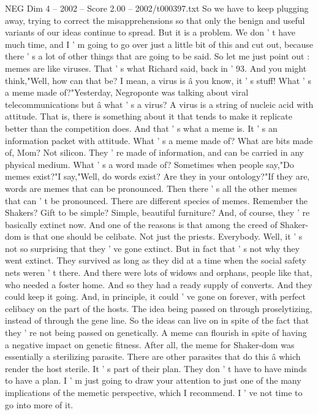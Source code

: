 \begin{textsample}{NEG Dim 4 – 2002 – Score 2.00 – 2002/t000397.txt}
So we have to keep plugging away, trying to correct the misapprehensions so that only the benign and useful variants of our ideas continue to spread.
But it is a problem.
We don ' t have much time, and I ' m going to go over just a little bit of this and cut out, because there ' s a lot of other things that are going to be said.
So let me just point out : memes are like viruses.
That ' s what Richard said, back in ' 93.
And you might think,"Well, how can that be?
I mean, a virus is â you know, it ' s stuff!
What ' s a meme made of?"Yesterday, Negroponte was talking about viral telecommunications but â what ' s a virus?
A virus is a string of nucleic acid with attitude.
That is, there is something about it that tends to make it replicate better than the competition does.
And that ' s what a meme is.
It ' s an information packet with attitude.
What ' s a meme made of?
What are bits made of, Mom?
Not silicon.
They ' re made of information, and can be carried in any physical medium.
What ' s a word made of?
Sometimes when people say,"Do memes exist?"I say,"Well, do words exist?
Are they in your ontology?"If they are, words are memes that can be pronounced.
Then there ' s all the other memes that can ' t be pronounced.
There are different species of memes.
Remember the Shakers?
Gift to be simple?
Simple, beautiful furniture?
And, of course, they ' re basically extinct now.
And one of the reasons is that among the creed of Shaker-dom is that one should be celibate.
Not just the priests.
Everybody.
Well, it ' s not so surprising that they ' ve gone extinct.
But in fact that ' s not why they went extinct.
They survived as long as they did at a time when the social safety nets weren ' t there.
And there were lots of widows and orphans, people like that, who needed a foster home.
And so they had a ready supply of converts.
And they could keep it going.
And, in principle, it could ' ve gone on forever, with perfect celibacy on the part of the hosts.
The idea being passed on through proselytizing, instead of through the gene line.
So the ideas can live on in spite of the fact that they ' re not being passed on genetically.
A meme can flourish in spite of having a negative impact on genetic fitness.
After all, the meme for Shaker-dom was essentially a sterilizing parasite.
There are other parasites that do this â which render the host sterile.
It ' s part of their plan.
They don ' t have to have minds to have a plan.
I ' m just going to draw your attention to just one of the many implications of the memetic perspective, which I recommend.
I ' ve not time to go into more of it.

\end{textsample}
